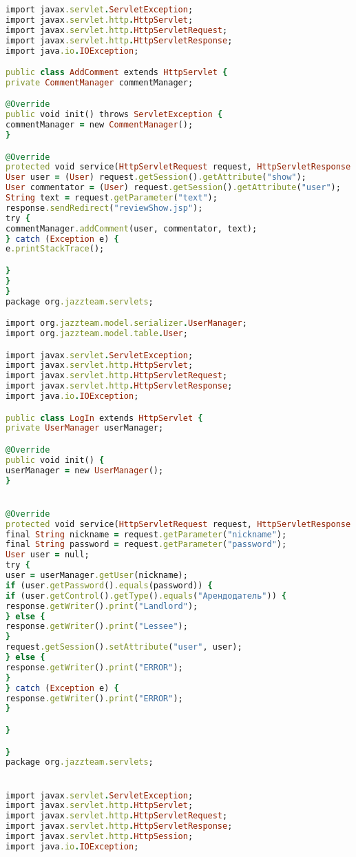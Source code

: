 \begin{lstlisting}[language=Ruby, style=rubystyle]
import javax.servlet.ServletException;
import javax.servlet.http.HttpServlet;
import javax.servlet.http.HttpServletRequest;
import javax.servlet.http.HttpServletResponse;
import java.io.IOException;

public class AddComment extends HttpServlet {
private CommentManager commentManager;

@Override
public void init() throws ServletException {
commentManager = new CommentManager();
}

@Override
protected void service(HttpServletRequest request, HttpServletResponse response) throws ServletException, IOException {
User user = (User) request.getSession().getAttribute("show");
User commentator = (User) request.getSession().getAttribute("user");
String text = request.getParameter("text");
response.sendRedirect("reviewShow.jsp");
try {
commentManager.addComment(user, commentator, text);
} catch (Exception e) {
e.printStackTrace();

}
}
}
package org.jazzteam.servlets;

import org.jazzteam.model.serializer.UserManager;
import org.jazzteam.model.table.User;

import javax.servlet.ServletException;
import javax.servlet.http.HttpServlet;
import javax.servlet.http.HttpServletRequest;
import javax.servlet.http.HttpServletResponse;
import java.io.IOException;

public class LogIn extends HttpServlet {
private UserManager userManager;

@Override
public void init() {
userManager = new UserManager();
}


@Override
protected void service(HttpServletRequest request, HttpServletResponse response) throws ServletException, IOException {
final String nickname = request.getParameter("nickname");
final String password = request.getParameter("password");
User user = null;
try {
user = userManager.getUser(nickname);
if (user.getPassword().equals(password)) {
if (user.getControl().getType().equals("Арендодатель")) {
response.getWriter().print("Landlord");
} else {
response.getWriter().print("Lessee");
}
request.getSession().setAttribute("user", user);
} else {
response.getWriter().print("ERROR");
}
} catch (Exception e) {
response.getWriter().print("ERROR");
}

}

}
package org.jazzteam.servlets;


import javax.servlet.ServletException;
import javax.servlet.http.HttpServlet;
import javax.servlet.http.HttpServletRequest;
import javax.servlet.http.HttpServletResponse;
import javax.servlet.http.HttpSession;
import java.io.IOException;


\end{lstlisting}
